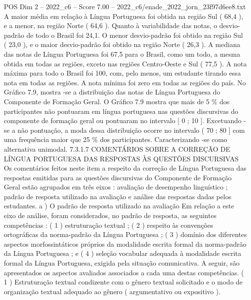 \begin{textsample}{POS Dim 2 – 2022\_c6 – Score 7.00 – 2022\_c6/enade\_2022\_jorn\_23f97d6ee8.txt}
A maior média em relação à Língua Portuguesa foi obtida na região Sul ( 68,4 ), e a menor, na região Norte ( 64,6 ).
Quanto à variabilidade das notas, o desvio-padrão de todo o Brasil foi 24,1.
O menor desvio-padrão foi obtido na região Sul ( 23,0 ), e o maior desvio-padrão foi obtido na região Norte ( 26,3 ).
A mediana das notas de Língua Portuguesa foi 67,5 para o Brasil, como um todo, a mesma obtida em todas as regiões, exceto nas regiões Centro-Oeste e Sul ( 77,5 ).
A nota máxima para todo o Brasil foi 100, com, pelo menos, um estudante tirando essa nota em todas as regiões.
A nota mínima foi zero em todas as regiões do país.
No Gráfico 7.9, mostra -se a distribuição das notas de Língua Portuguesa do Componente de Formação Geral.
O Gráfico 7.9 mostra que mais de 5 \% dos participantes não pontuaram em língua portuguesa nas questões discursivas do componente de formação geral ou pontuaram no intervalo [ 0 ; 10 ].
Excetuando -se a não pontuação, a moda dessa distribuição ocorre no intervalo ( 70 ; 80 ] com uma frequência maior que 25 \% dos participantes.
Caracterizando -se como alternativa unimodal. 7.3.1.7 COMENTÁRIOS SOBRE A CORREÇÃO DE LÍNGUA PORTUGUESA DAS RESPOSTAS ÀS QUESTÕES DISCURSIVAS Os comentários feitos neste item a respeito da correção de Língua Portuguesa das respostas emitidas para as questões discursivas do Componente de Formação Geral estão agrupados em três eixos : avaliação de desempenho linguístico ; padrão de resposta utilizado na avaliação e análise das respostas dadas pelos estudantes. a ) O padrão de resposta utilizado na avaliação Em relação a este eixo de análise, foram considerados, no padrão de resposta, as seguintes competências : ( 1 ) estruturação textual ; ( 2 ) respeito às convenções ortográficas da norma-padrão da Língua Portuguesa ; ( 3 ) domínio dos diferentes aspectos morfossintáticos próprios da modalidade escrita formal da norma-padrão da Língua Portuguesa ; e ( 4 ) seleção vocabular adequada à modalidade escrita formal da Língua Portuguesa, exigida pela situação comunicativa.
A seguir, são apresentados os aspectos avaliados associados a cada uma destas competências. ( 1 ) Estruturação textual condizente com o gênero textual solicitado e o modo de organização textual adequado ao gênero ( argumentativo ou expositivo ).

\end{textsample}
